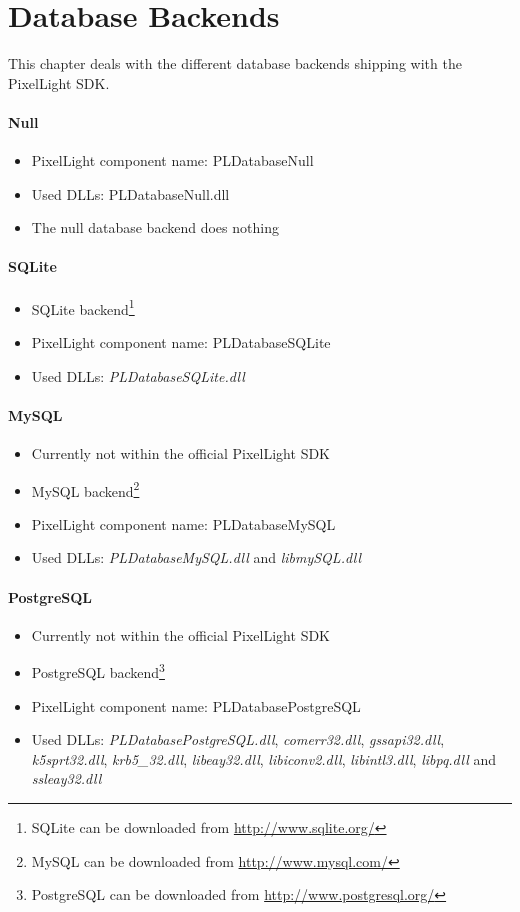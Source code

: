 \section{Database Backends}
This chapter deals with the different database backends shipping with the PixelLight \ac{SDK}.


\paragraph{Null}
\begin{itemize}
\item PixelLight component name: PLDatabaseNull
\item Used \ac{DLL}s: PLDatabaseNull.dll
\item The null database backend does nothing
\end{itemize}


\paragraph{SQLite}
\begin{itemize}
\item SQLite backend\footnote{SQLite can be downloaded from \url{http://www.sqlite.org/}}
\item PixelLight component name: PLDatabaseSQLite
\item Used \ac{DLL}s: \emph{PLDatabaseSQLite.dll}
\end{itemize}


\paragraph{MySQL}
\begin{itemize}
\item Currently not within the official PixelLight \ac{SDK}
\item MySQL backend\footnote{MySQL can be downloaded from \url{http://www.mysql.com/}}
\item PixelLight component name: PLDatabaseMySQL
\item Used \ac{DLL}s: \emph{PLDatabaseMySQL.dll} and \emph{libmySQL.dll}
\end{itemize}


\paragraph{PostgreSQL}
\begin{itemize}
\item Currently not within the official PixelLight \ac{SDK}
\item PostgreSQL backend\footnote{PostgreSQL can be downloaded from \url{http://www.postgresql.org/}}
\item PixelLight component name: PLDatabasePostgreSQL
\item Used \ac{DLL}s: \emph{PLDatabasePostgreSQL.dll}, \emph{comerr32.dll}, \emph{gssapi32.dll}, \emph{k5sprt32.dll}, \emph{krb5\_32.dll}, \emph{libeay32.dll}, \emph{libiconv2.dll}, \emph{libintl3.dll}, \emph{libpq.dll} and \emph{ssleay32.dll}
\end{itemize}
